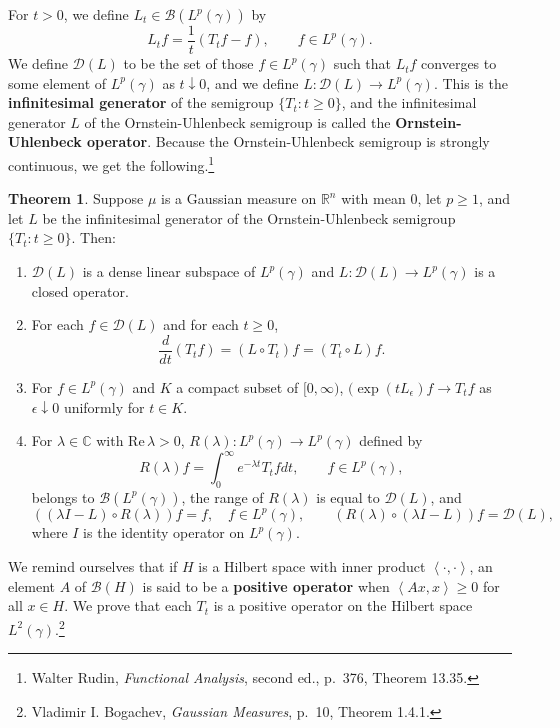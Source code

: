 \documentclass{article}
\newcommand{\inner}[2]{\left\langle #1, #2 \right\rangle}
\def\Re{\ensuremath{\mathrm{Re}}\,}
\theoremstyle{definition}
\newtheorem{theorem}{Theorem}
\theoremstyle{definition}
\begin{document}
For $t >0$, we define $L_t \in \mathscr{B}(L^p(\gamma))$ by 
\[
L_t f =\frac{1}{t}(T_t f -f), \qquad f \in L^p(\gamma).
\]
We define $\mathscr{D}(L)$ to be the set of those $f \in L^p(\gamma)$ such that $L_t f$ converges to
some element of $L^p(\gamma)$ as $t \downarrow 0$,
and we define 
$L:\mathscr{D}(L) \to L^p(\gamma)$. This is the \textbf{infinitesimal generator} of the semigroup $\{T_t: t \geq 0\}$, and the infinitesimal generator $L$ of the 
Ornstein-Uhlenbeck semigroup is called the \textbf{Ornstein-Uhlenbeck operator}.
Because the Ornstein-Uhlenbeck semigroup is strongly continuous, we get the following.\footnote{Walter Rudin, {\em Functional Analysis},
second ed., p.~376, Theorem 13.35.} 

\begin{theorem}
Suppose $\mu$ is a Gaussian measure on $\mathbb{R}^n$ with mean $0$, let $p\geq 1$, and let 
$L$ be the infinitesimal generator of the Ornstein-Uhlenbeck semigroup $\{T_t:t \geq 0\}$. Then:
\begin{enumerate}
\item $\mathscr{D}(L)$ is a dense linear subspace of $L^p(\gamma)$ and $L:\mathscr{D}(L) \to L^p(\gamma)$ is a closed operator.
\item For each $f \in \mathscr{D}(L)$ and for each $t \geq 0$,
\[
\frac{d}{dt} (T_tf) = (L \circ T_t) f = (T_t \circ L) f.
\]
\item For $f \in L^p(\gamma)$ and $K$ a compact subset of $[0,\infty)$, 
$(\exp(t L_\epsilon)f \to T_t f$ as $\epsilon \downarrow 0$ uniformly for $t \in K$. 
\item For $\lambda \in \mathbb{C}$ with $\Re \lambda>0$, $R(\lambda):L^p(\gamma) \to L^p(\gamma)$ defined by
\[
R(\lambda)f = \int_0^\infty e^{-\lambda t} T_t f dt, \qquad f \in L^p(\gamma),
\]
belongs to $\mathscr{B}(L^p(\gamma))$, the range of $R(\lambda)$ is equal to $\mathscr{D}(L)$, and
\[
((\lambda I-L) \circ R(\lambda))f = f, \quad f \in L^p(\gamma),
\qquad (R(\lambda) \circ (\lambda I-L))f = \mathscr{D}(L),
\]
where $I$ is the identity operator on $L^p(\gamma)$. 
\end{enumerate}
\label{generator}
\end{theorem}



We remind ourselves that if $H$ is a Hilbert space with inner product $\inner{\cdot}{\cdot}$,
an element $A$ of $\mathscr{B}(H)$ is said to be a \textbf{positive operator} when
$\inner{Ax}{x} \geq 0$ for all $x \in H$.
We prove that each $T_t$ is a positive operator on the Hilbert space $L^2(\gamma)$.\footnote{Vladimir I. Bogachev,
{\em Gaussian Measures}, p.~10, Theorem 1.4.1.}
\end{document}
